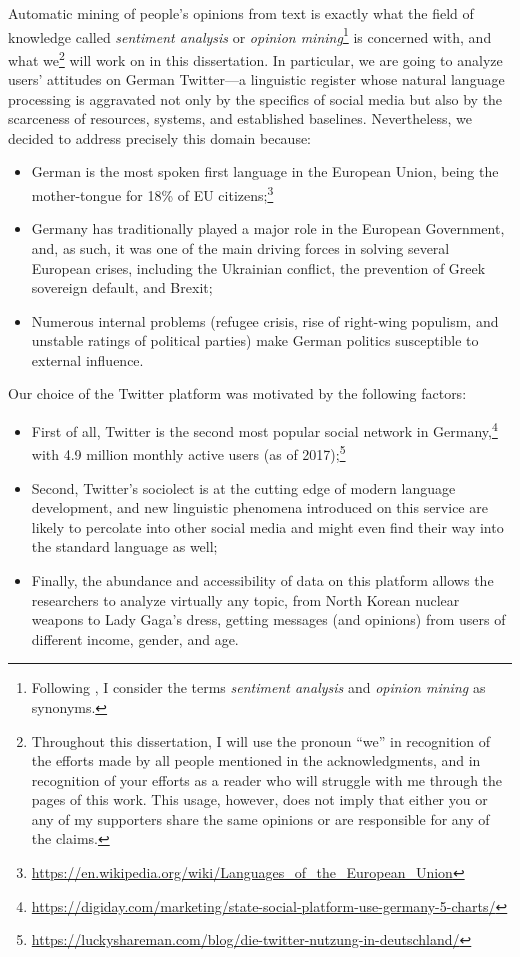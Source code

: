 Automatic mining of people's opinions from text is exactly what the
field of knowledge called \emph{sentiment analysis} or \emph{opinion
  mining}\footnote{Following \citet{Liu:12}, I consider the terms
  \emph{sentiment analysis} and \emph{opinion mining} as synonyms.} is
concerned with, and what we\footnote{Throughout this dissertation, I
  will use the pronoun ``we'' in recognition of the efforts made by
  all people mentioned in the acknowledgments, and in recognition of
  your efforts as a reader who will struggle with me through the pages
  of this work.  This usage, however, does not imply that either you
  or any of my supporters share the same opinions or are responsible
  for any of the claims.} will work on in this dissertation.  In
particular, we are going to analyze users' attitudes on German
Twitter---a linguistic register whose natural language processing is
aggravated not only by the specifics of social media but also by the
scarceness of resources, systems, and established baselines.
Nevertheless, we decided to address precisely this domain because:
\begin{itemize}
  \item German is the most spoken first language in the European
    Union, being the mother-tongue for 18\% of EU
    citizens;\footnote{\url{https://en.wikipedia.org/wiki/Languages_of_the_European_Union}}
  \item Germany has traditionally played a major role in the European
    Government, and, as such, it was one of the main driving forces in
    solving several European crises, including the Ukrainian conflict,
    the prevention of Greek sovereign default, and Brexit;
  \item Numerous internal problems (refugee crisis, rise of right-wing
    populism, and unstable ratings of political parties) make German
    politics susceptible to external influence.
\end{itemize}

Our choice of the Twitter platform was motivated by the following
factors:
\begin{itemize}
  \item First of all, Twitter is the second most popular social
    network in
    Germany,\footnote{\url{https://digiday.com/marketing/state-social-platform-use-germany-5-charts/}}
    with 4.9 million monthly active users (as of
    2017);\footnote{\url{https://luckyshareman.com/blog/die-twitter-nutzung-in-deutschland/}}
  \item Second, Twitter's sociolect is at the cutting edge of modern
    language development, and new linguistic phenomena introduced on
    this service are likely to percolate into other social media and
    might even find their way into the standard language as well;
  \item Finally, the abundance and accessibility of data on this
    platform allows the researchers to analyze virtually any topic,
    from North Korean nuclear weapons to Lady Gaga's dress, getting
    messages (and opinions) from users of different income, gender,
    and age.
\end{itemize}

